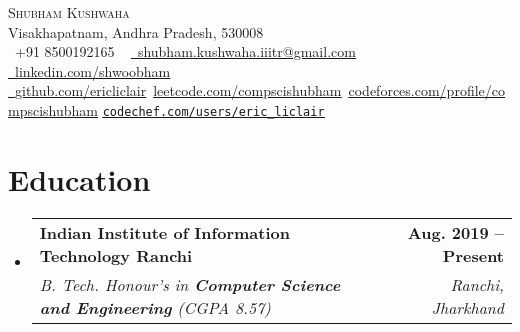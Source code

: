 \documentclass[letterpaper,11pt]{article}
\makeatletter
\newcommand{\resumeSubheading}[4]{
  \vspace{-2pt}\item
    \begin{tabular*}{1.0\textwidth}[t]{l@{\extracolsep{\fill}}r}
      \textbf{#1} & \textbf{\small #2} \\
      \textit{\small#3} & \textit{\small #4} \\
    \end{tabular*}\vspace{-7pt}
}
\newcommand{\resumeSubHeadingListStart}{\begin{itemize}[leftmargin=0.0in, label={}]}
\newcommand{\resumeSubHeadingListEnd}{\end{itemize}}
\makeatother
\begin{document}

    {\Huge \scshape Shubham Kushwaha} \\ \vspace{1pt}
    Visakhapatnam, Andhra Pradesh, 530008 \\ \vspace{1pt}
    \small \raisebox{-0.1\height}\faPhone\ +91 8500192165 ~ \href{mailto:shubham.kushwaha.iiitranchi@gmail.com}{\raisebox{-0.2\height}\faEnvelope\  \underline{shubham.kushwaha.iiitr@gmail.com}} ~
    \href{https://linkedin.com/in/shwoobham}{\raisebox{-0.2\height}\faLinkedin\ \underline{linkedin.com/shwoobham}}  ~
    \href{https://github.com/ericliclair}{\raisebox{-0.2\height}\faGithub\ \underline{github.com/ericliclair}}\
    \href{https://leetcode.com/compscishubham}{\underline{leetcode.com/compscishubham}}\
    \href{https://codeforces.com/profile/compscishubham}{\underline{codeforces.com/profile/compscishubham}}
    \href{https://www.codechef.com/users/eric_liclair}{\underline \texttt{\underline {codechef.com/users/eric\_liclair}}}
    \vspace{-8pt}


\section{Education}
  \resumeSubHeadingListStart
    \resumeSubheading
      {Indian Institute of Information Technology Ranchi}{Aug. 2019 -- Present}
      {B. Tech. Honour's in \textbf{Computer Science and Engineering} (CGPA 8.57)}{Ranchi, Jharkhand}
  \resumeSubHeadingListEnd

\end{document}
